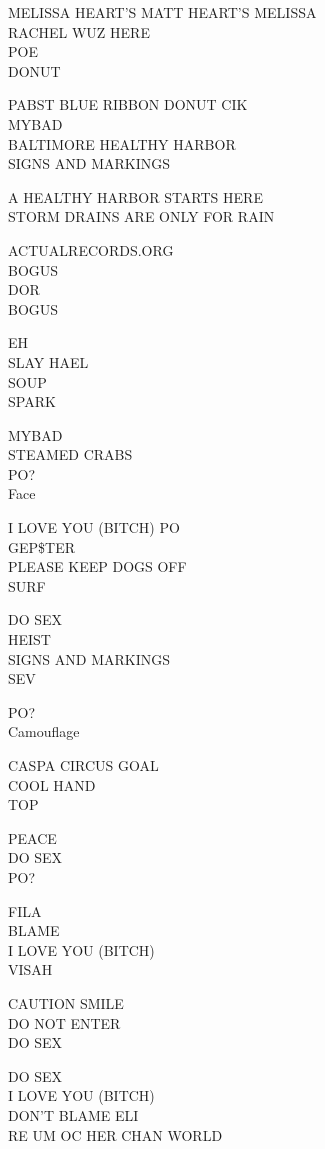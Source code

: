\documentclass[10pt,letterpaper]{article}
\begin{document}
MELISSA HEART'S MATT HEART'S MELISSA\\
RACHEL WUZ HERE\\
POE\\
DONUT

PABST BLUE RIBBON DONUT CIK\\
MYBAD\\
BALTIMORE HEALTHY HARBOR\\
SIGNS AND MARKINGS

A HEALTHY HARBOR STARTS HERE\\
STORM DRAINS ARE ONLY FOR RAIN

ACTUALRECORDS.ORG\\
BOGUS\\
DOR\\
BOGUS

EH\\
SLAY HAEL\\
SOUP\\
SPARK

MYBAD\\
STEAMED CRABS\\
PO?\\
Face

I LOVE YOU (BITCH) PO\\
GEP\$TER\\
PLEASE KEEP DOGS OFF\\
SURF

DO SEX\\
HEIST\\
SIGNS AND MARKINGS\\
SEV

PO?\\
Camouflage

CASPA CIRCUS GOAL\\
COOL HAND\\
TOP

PEACE\\
DO SEX\\
PO?

FILA\\
BLAME\\
I LOVE YOU (BITCH)\\
VISAH

CAUTION SMILE\\
DO NOT ENTER\\
DO SEX

DO SEX\\
I LOVE YOU (BITCH)\\
DON'T BLAME ELI\\
RE UM OC HER CHAN WORLD
\end{document}

